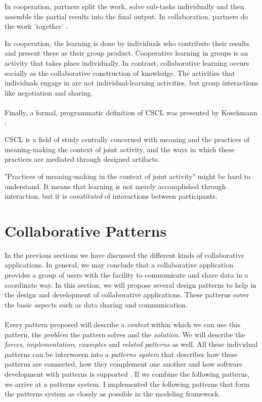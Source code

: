 \begin{mydef}
In cooperation, partners split the work, solve sub-tasks individually and then assemble the partial results into the final output. In collaboration, partners do the work 'together' \cite {DefinitionCSCL}.
\end{mydef}

In cooperation, the learning is done by individuals who contribute their results and present these as their group product. Cooperative learning in groups is an activity that takes place individually. In contrast, collaborative learning occurs socially as the collaborative construction of knowledge. The activities that individuals engage in are not individual-learning activities, but group interactions like negotiation and sharing.
\\ \\
Finally, a formal, programmatic definition of CSCL was presented by Koschmann \cite{DefinitionCSCL2}:
\begin{mydef}
CSCL is a field of study centrally concerned with meaning and the practices of meaning-making the context of joint activity, and the ways in which these practices are mediated through designed artifacts.
\end{mydef}
"Practices of meaning-making in the context of joint activity" might be hard to understand. It means that learning is not merely accomplished through interaction, but it is \textit{constituted} of interactions between participants. 

\section{Collaborative Patterns}

In the previous sections we have discussed the different kinds of collaborative applications. In general, we may conclude that a collaborative application provides a group of users with the facility to communicate and share data in a coordinate way. In this section, we will propose several design patterns to help in the design and development of collaborative applications. These patterns cover the basic aspects such as data sharing and communication.
\\ \\
Every pattern proposed will describe a \textit{context} within which we can use this pattern, the \textit{problem} the pattern solves and the \textit{solution}. We will describe the \textit{forces}, \textit{implementation}, \textit{examples} and \textit{related patterns} as well. All these individual patterns can be interwoven into a \textit{patterns system} that describes how these patterns are connected, how they complement one another and how software development with patterns is supported \cite{DesignPatternsColl}. If we combine the following patterns, we arrive at a patterns system. I implemented the following patterns that form the patterns system as closely as possible in the modeling framework.

